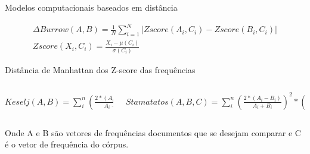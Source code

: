 \begin{frame}{Modelos computacionais baseados em distância}
\selectFont
\begin{tcolorbox}[colback=blue!5!white,colframe=blue!75!black,valign=center,title=Regra $\Delta$ de Burrows ]\selectFont
	\begin{equation}
	\begin{aligned}
	\Delta Burrow \left ( A, B \right) = \frac{1}{N}\sum_{i=1}^{N}\left | Zscore(A_i,C_i) - Zscore(B_i,C_i) \right |
	\\
	Zscore(X_i,C_i)= \frac{X_i - \mu (C_i) }{\sigma(C_i)}
	\end{aligned}
	\label{eq:deltaBorrow}
	\end{equation}
		
	Distância de Manhattan dos Z-score das frequências         
\end{tcolorbox}


	\begin{columns}
	\begin{column}{0.48\textwidth}
		\begin{tcolorbox}[title=Keselj,height=2cm,valign=center]\selectFont
			$
			Keselj (A,B) = \sum_i^n \left ( \frac{ 2*\left(A_i-B_i \right ) }{A_i+B_i}\right )^{2}
			$
		\end{tcolorbox}
	\end{column}
	\begin{column}{0.48\textwidth}\selectFont
		\begin{tcolorbox}[title=Stamatatos,height=2cm,valign=center]\selectFont
			$
Stamatatos (A,B, C) = \sum_i^n \left ( \frac{ 2*\left(A_i-B_i \right ) }{A_i+B_i}\right )^{2} * \left ( \frac{ 2*\left(A_i-C_i \right ) }{A_i+C_i}\right )^{2}
			$      
		\end{tcolorbox}
	\end{column}
\end{columns}

Onde A e B são vetores de frequências documentos que se desejam comparar e C é o vetor de frequência do córpus.

\end{frame}


